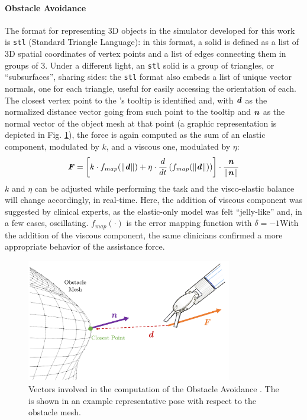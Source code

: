 \documentclass[../main.tex]{subfiles}
\begin{document}
\paragraph{Obstacle Avoidance} The format for representing 3D objects in the simulator developed for this work is \texttt{stl} (Standard Triangle Language): in this format, a solid is defined as a list of 3D spatial coordinates of vertex points and a list of edges connecting them in groups of 3. Under a different light, an \texttt{stl} solid is a group of triangles, or ``subsurfaces'', sharing sides: the \texttt{stl} format also embeds a list of unique vector normals, one for each triangle, useful for easily accessing the orientation of each. The closest vertex point to the \psm's tooltip is identified and, with $\textbf{\textit{d}}$ as the normalized distance vector going from such point to the tooltip and $\textbf{\textit{n}}$ as the normal vector of the object mesh at that point (a graphic representation is depicted in Fig. \ref{fig:obstacleavoidance}), the force is again computed as the sum of an elastic component, modulated by $k$, and a viscous one, modulated by $\eta$:
\begin{equation}
    \textbf{\textit{F}} = \left[k\cdot f_{map}(\|\textbf{\textit{d}}\|) + \eta\cdot \frac{d}{dt} \left( f_{map}(\|\textbf{\textit{d}}\|)\right)\right]\cdot \frac{\textbf{\textit{n}}}{\|\textbf{\textit{n}}\|} 
    \label{eq:obstacleavoidancef}
\end{equation}
$k$ and $\eta$ can be adjusted while performing the task and the visco-elastic balance will change accordingly, in real-time. Here, the addition of viscous component was suggested by clinical experts, as the elastic-only model was felt ``jelly-like'' and, in a few cases, oscillating. $f_{map}(\cdot)$ is the error mapping function with $\delta=-1$With the addition of the viscous component, the same clinicians confirmed a more appropriate behavior of the assistance force.

\begin{figure}
    \centering
    \includegraphics[width=0.8\textwidth]{images/obstacle_avoidance.png}
    \caption{Vectors involved in the computation of the Obstacle Avoidance \vf. The \psm is shown in an example representative pose with respect to the obstacle mesh.}
    \label{fig:obstacleavoidance}
\end{figure}
\end{document}
